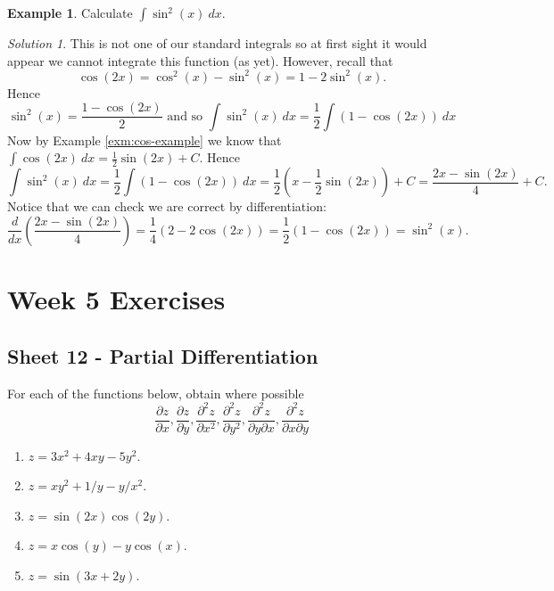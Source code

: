 \documentclass[
  11pt,
  oneside]{book}
\providecommand{\tightlist}{%
  \setlength{\itemsep}{0pt}\setlength{\parskip}{0pt}}
\newcommand{\slide}{}
\theoremstyle{definition}
\theoremstyle{definition}
\newtheorem{example}{Example}[chapter]
\theoremstyle{definition}
\theoremstyle{definition}
\theoremstyle{remark}
\newtheorem*{solution}{Solution}
\begin{document}
\slide

\begin{example}
Calculate \(\displaystyle\int\sin^2(x)\ dx\).
\end{example}

\begin{solution}
This is not one of our standard integrals so at first sight it would appear we cannot integrate this function (as yet). However, recall that
\[
\cos(2x) = \cos^2(x)-\sin^2(x) = 1-2\sin^2(x).
\]
Hence
\[
\sin^2(x) = \frac{1-\cos(2x)}{2}\text{ and so }\int\sin^2(x)\ dx = \frac12\int(1-\cos(2x))\ dx
\]
Now by Example \ref{exm:cos-example} we know that \(\displaystyle\int\cos(2x)\ dx = \frac12\sin(2x)+C\).
Hence
\[
\int\sin^2(x)\ dx = \frac12\int(1-\cos(2x))\ dx = \frac12\left(x-\frac12\sin(2x)\right)+C = \frac{2x-\sin(2x)}{4}+C.
\]
Notice that we can check we are correct by differentiation:
\[
\frac{d}{dx}\left(\frac{2x-\sin(2x)}{4}\right)=\frac14\left(2-2\cos(2x)\right)=\frac12\left(1-\cos(2x)\right)=\sin^2(x).
\]
\end{solution}

\chapter*{Week 5 Exercises}\label{week-5-exercises}

\section{Sheet 12 - Partial Differentiation}\label{sheet-12---partial-differentiation}

For each of the functions below, obtain where possible
\[
\frac{\partial z}{\partial x}, \frac{\partial z}{\partial y}, \frac{\partial^2 z}{\partial x^2}, \frac{\partial^2 z}{\partial y^2}, \frac{\partial^2 z}{\partial y\partial x}, \frac{\partial^2 z}{\partial x\partial y}
\]

\begin{enumerate}
\def\labelenumi{\arabic{enumi}.}
\tightlist
\item
  \(z=3x^2+4xy-5y^2\).
\item
  \(z=xy^2+1/y-y/x^2\).
\item
  \(z=\sin(2x)\cos(2y)\).
\item
  \(z=x\cos(y)-y\cos(x)\).
\item
  \(z=\sin(3x+2y)\).
\end{enumerate}
\end{document}
